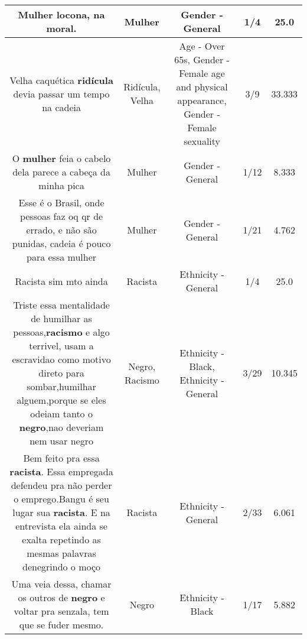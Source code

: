 \documentclass[11pt]{article}
\newlength\mylength
\begin{document}
\begin{center}
\begin{longtable}{|C{.65\mylength}|C{.30\mylength}|C{.12\mylength}|C{.12\mylength}|C{.12\mylength}|}
  \small Mulher locona, na moral.\normalsize   & Mulher & Gender - General & 1/4 & 25.0 \\  \hline
  \small Velha caquética \textbf{ridícula} devia passar um tempo na cadeia\normalsize   & Ridícula, Velha & Age - Over 65s, Gender - Female age and physical appearance, Gender - Female sexuality & 3/9 & 33.333 \\  \hline
  \small O \textbf{mulher} feia o cabelo dela parece a cabeça da minha pica\normalsize   & Mulher & Gender - General & 1/12 & 8.333 \\  \hline
  \small Esse é o Brasil, onde pessoas faz oq qr de errado, e não são punidas,  cadeia é pouco para essa mulher\normalsize   & Mulher & Gender - General & 1/21 & 4.762 \\  \hline
  \small Racista sim mto ainda\normalsize   & Racista & Ethnicity - General & 1/4 & 25.0 \\  \hline
  \small Triste essa mentalidade de humilhar as pessoas,\textbf{racismo} e algo terrivel, usam a escravidao como motivo direto para sombar,humilhar alguem,porque se eles odeiam tanto o \textbf{negro},nao deveriam nem usar negro\normalsize   & Negro, Racismo & Ethnicity - Black, Ethnicity - General & 3/29 & 10.345 \\  \hline
  \small Bem  feito pra essa \textbf{racista}. Essa  empregada  defendeu  pra não perder  o emprego.Bangu   é   seu lugar  sua  \textbf{racista}. E na entrevista  ela   ainda se  exalta   repetindo  as mesmas palavras  denegrindo o moço\normalsize   & Racista & Ethnicity - General & 2/33 & 6.061 \\  \hline
  \small Uma veia dessa, chamar os outros de \textbf{negro} e voltar pra senzala, tem que se fuder mesmo.\normalsize   & Negro & Ethnicity - Black & 1/17 & 5.882 \\  \hline

\end{longtable}
\end{center}
\end{document}
